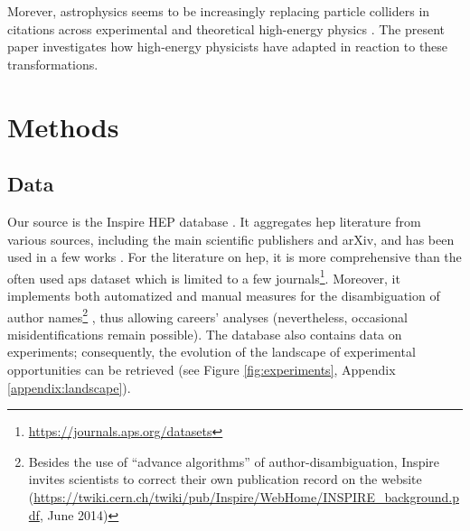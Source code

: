 \documentclass{article}
\begin{document}
Morever, astrophysics seems to be increasingly replacing particle colliders in citations across experimental and theoretical high-energy physics \citep{Gautheron2023}. %
The present paper investigates how high-energy physicists have adapted in reaction to these transformations. %

\section{\label{sec:methods}Methods}

\subsection{\label{sec:data}Data}

Our source is the Inspire HEP database \citep{InspireAPI}. It aggregates \gls{hep} literature from various sources, including the main scientific publishers and arXiv, and has been used in a few works \citep{Gautheron2023,Perovi2016,Chall2019a,Strumia2021,Sikimi2022}. For the literature on \gls{hep}, it is more comprehensive than the often used \gls{aps} dataset which is limited to a few journals\footnote{\url{https://journals.aps.org/datasets}}. %
Moreover, it implements both automatized and manual measures for the disambiguation of author names\footnote{Besides the use of ``advance algorithms'' of author-disambiguation, Inspire invites scientists to correct their own publication record on the website (\url{https://twiki.cern.ch/twiki/pub/Inspire/WebHome/INSPIRE_background.pdf}, June 2014)} %
, thus allowing careers' analyses \citep{Strumia2021} (nevertheless, occasional misidentifications remain possible). The database also contains data on experiments; consequently, the evolution of the landscape of experimental opportunities can be retrieved (see Figure \ref{fig:experiments}, Appendix \ref{appendix:landscape}). %
\end{document}
